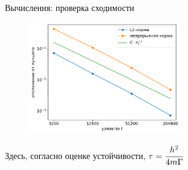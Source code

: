 \begin{frame}{Вычисления: проверка сходимости}
\vspace{-0.3cm}
\begin{figure}
	\includegraphics[width=0.58\textwidth]{figures/convergence_connected.png}
\end{figure}
\vspace{-0.6cm}
\begin{center}
	Здесь, согласно оценке устойчивости, $\tau = \cfrac{h^2}{4m \Gamma}$
\end{center}
\end{frame}


